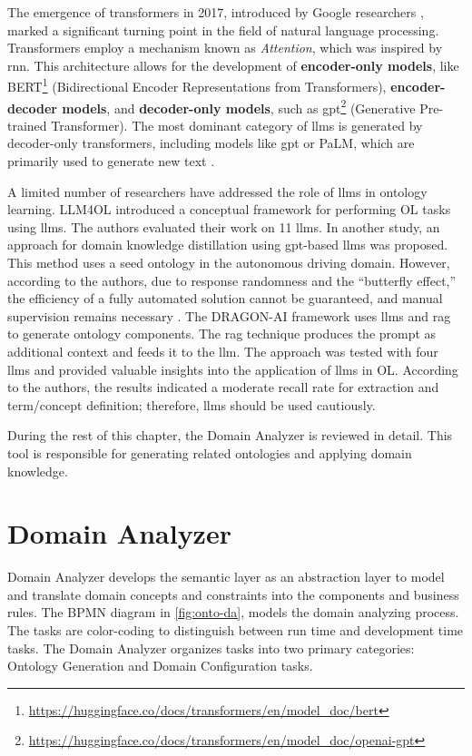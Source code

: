\begin{itemize}
The emergence of transformers in 2017, introduced by Google researchers
\autocite{Vaswani2017}, marked a significant turning point in the
field of natural language processing. Transformers employ a mechanism
known as \emph{Attention}, which was inspired by \gls{rnn}. This architecture allows for the development of
\textbf{encoder-only models}, like BERT\footnote{\url{https://huggingface.co/docs/transformers/en/model_doc/bert}}
(Bidirectional Encoder Representations from Transformers),
\textbf{encoder-decoder models}, and \textbf{decoder-only models}, such
as \gls{gpt}\footnote{\url{https://huggingface.co/docs/transformers/en/model_doc/openai-gpt}}
(Generative Pre-trained Transformer). The most dominant category of \gls{llm}s
is generated by decoder-only transformers, including models like \gls{gpt} or
PaLM, which are primarily used to generate new text \autocite{Perera2024}.


A limited number of researchers have addressed the role of \gls{llm}s in
ontology learning. LLM4OL \autocite{Giglou2023} introduced a
conceptual framework for performing OL tasks using \gls{llm}s. The authors
evaluated their work on 11 \gls{llm}s. In another study, an approach for
domain knowledge distillation using \gls{gpt}-based \gls{llm}s was proposed. This
method uses a seed ontology in the autonomous driving domain. However,
according to the authors, due to response randomness and the
``butterfly effect,'' the efficiency of a fully automated solution
cannot be guaranteed, and manual supervision remains necessary
\autocite{Tang2023}. The DRAGON-AI framework \autocite{Toro2023} uses
\gls{llm}s and \gls{rag} to generate ontology
components. The \gls{rag} technique produces the prompt as additional context
and feeds it to the \gls{llm}. The approach was tested with four \gls{llm}s and
provided valuable insights into the application of \gls{llm}s in OL.
According to the authors, the results indicated a moderate recall rate
for extraction and term/concept definition; therefore, \gls{llm}s should be
used cautiously.


During the rest of this chapter, the Domain Analyzer is reviewed in
detail. This tool is responsible for generating related ontologies and
applying domain knowledge.

\end{itemize}

\vspace{-10pt}
\hypertarget{sec:onto.domain-analyser}{%
\section{Domain Analyzer}\label{sec:onto.domain-analyser}}
\vspace{10pt}
Domain Analyzer develops the semantic layer as an abstraction layer to model and translate domain concepts and constraints into the components and business rules. The BPMN diagram in \cref{fig:onto-da}, models the domain analyzing process. The tasks are color-coding to distinguish between run time and development time tasks. The Domain Analyzer organizes tasks into two primary categories: Ontology Generation and Domain Configuration tasks.

